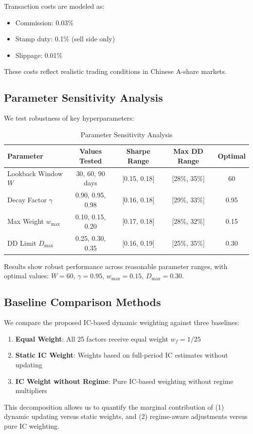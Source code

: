 Transaction costs are modeled as:
\begin{itemize}
    \item Commission: 0.03\%
    \item Stamp duty: 0.1\% (sell side only)
    \item Slippage: 0.01\%
\end{itemize}

These costs reflect realistic trading conditions in Chinese A-share markets.

\subsection{Parameter Sensitivity Analysis}

We test robustness of key hyperparameters:

\begin{table}[h]
\centering
\caption{Parameter Sensitivity Analysis}
\label{tab:sensitivity}
\begin{tabular}{lcccc}
\toprule
Parameter & Values Tested & Sharpe Range & Max DD Range & Optimal \\
\midrule
Lookback Window $W$ & 30, 60, 90 days & [0.15, 0.18] & [28\%, 35\%] & 60 \\
Decay Factor $\gamma$ & 0.90, 0.95, 0.98 & [0.16, 0.18] & [29\%, 33\%] & 0.95 \\
Max Weight $w_{\max}$ & 0.10, 0.15, 0.20 & [0.17, 0.18] & [28\%, 32\%] & 0.15 \\
DD Limit $D_{\max}$ & 0.25, 0.30, 0.35 & [0.16, 0.19] & [25\%, 35\%] & 0.30 \\
\bottomrule
\end{tabular}
\end{table}

Results show robust performance across reasonable parameter ranges, with optimal values: $W=60$, $\gamma=0.95$, $w_{\max}=0.15$, $D_{\max}=0.30$.

\subsection{Baseline Comparison Methods}

We compare the proposed IC-based dynamic weighting against three baselines:

\begin{enumerate}
    \item \textbf{Equal Weight}: All 25 factors receive equal weight $w_f = 1/25$
    \item \textbf{Static IC Weight}: Weights based on full-period IC estimates without updating
    \item \textbf{IC Weight without Regime}: Pure IC-based weighting without regime multipliers
\end{enumerate}

This decomposition allows us to quantify the marginal contribution of (1) dynamic updating versus static weights, and (2) regime-aware adjustments versus pure IC weighting.